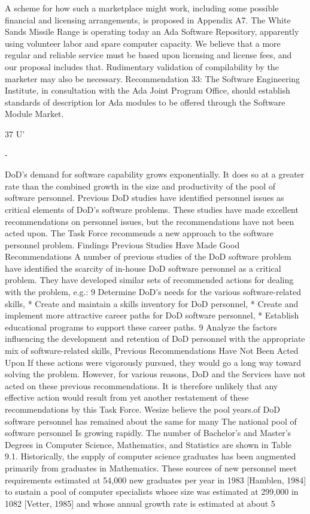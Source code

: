 \documentclass[12pt]{article}
\begin{document}
A scheme for how such a marketplace might work, including some possible financial
and licensing arrangements, is proposed in Appendix A7.
The White Sands Missile Range is operating today an Ada Software Repository,
apparently using volunteer labor and spare computer capacity. We believe that a more
regular and reliable service must be based upon licensing and license fees, and our proposal
includes that. Rudimentary validation of compilability by the marketer may also be
necessary.
Recommendation 33: The Software Engineering Institute, in consultation
with the Ada Joint Program Office, should establish standards of description
lor Ada modules to be offered through the Software Module Market.

37
U'

-

DoD's demand for software capability grows exponentially. It does so at a greater rate
than the combined growth in the size and productivity of the pool of software personnel.
Previous DoD studies have identified personnel issues as critical elements of DoD's
software problems. These studies have made excellent recommendations on personnel
issues, but the recommendations have not been acted upon.
The Task Force recommends a new approach to the software personnel problem.
Findings
Previous Studies Have Made Good Recommendations
A number of previous studies of the DoD software problem have identified the scarcity
of in-house DoD software personnel as a critical problem. They have developed similar
sets of recommended actions for dealing with the problem, e.g.:
9 Determine DoD's needs for the various software-related skills,
* Create and maintain a skills inventory for DoD personnel,
* Create and implement more attractive career paths for DoD software personnel,
* Establish educational programs to support these career paths.
9 Analyze the factors influencing the development and retention of DoD personnel
with the appropriate mix of software-related skills,
Previous Recommendations Have Not Been Acted Upon
If these actions were vigorously pursued, they would go a long way toward solving the
problem.
However, for various reasons, DoD and the Services have not acted on these previous
recommendations. It is therefore unlikely that any effective action would result from yet
another restatement of these recommendations by this Task Force.
Wesize
believe
the pool
years.of DoD software personnel has remained about the
same
for many
The national pool of software personnel Is growing rapidly.
The number of Bachelor's and Master's Degrees in Computer Science, Mathematics,
and Statistics are shown in Table 9.1. Historically, the supply of computer science
graduates has been augmented primarily from graduates in Mathematics. These sources
of new personnel meet requirements estimated at 54,000 new graduates per year in 1983
[Hamblen, 1984] to sustain a pool of computer specialists whoee size was estimated at
299,000 in 1082 [Vetter, 1985] and whose annual growth rate is estimated at about 5%
\end{document}

